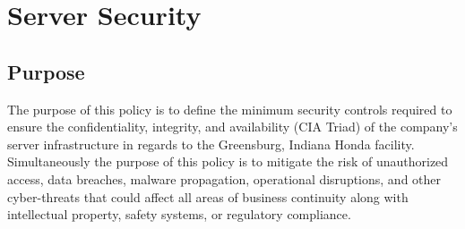 \chapter{Server Security}
\pagestyle{fancy}

\fancyhf{}

\fancyfoot[C]{\thepage}

\renewcommand{\headrulewidth}{0pt}
\renewcommand{\footrulewidth}{0pt}

\section{Purpose}
The purpose of this policy is to define the minimum security controls required to ensure the confidentiality, integrity, and availability (CIA Triad) of the company’s server infrastructure in regards to the Greensburg, Indiana Honda facility. Simultaneously the purpose of this policy is to mitigate the risk of unauthorized access, data breaches, malware propagation, operational disruptions, and other cyber-threats that could affect all areas of business continuity along with intellectual property, safety systems, or regulatory compliance.
